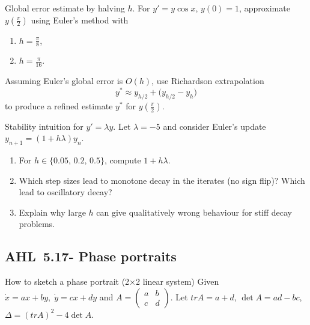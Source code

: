 \documentclass[11pt]{article}
\def\textbf#1{#1}%
\def\mathrm#1{#1}%
\newcommand{\tocsubsection}[1]{\subsection{#1}}
\newcounter{question}
\begin{document}
\begin{question}
\textbf{Global error estimate by halving $h$.}
For $y' = y\cos x$, $y(0)=1$, approximate $y(\tfrac{\pi}{2})$ using Euler’s method with
\begin{enumerate}
  \item $h=\tfrac{\pi}{8}$,
  \item $h=\tfrac{\pi}{16}$.
\end{enumerate}
Assuming Euler’s global error is $O(h)$, use Richardson extrapolation
\[
y^\ast \approx y_{h/2} + \big(y_{h/2}-y_h\big)
\]
to produce a refined estimate $y^\ast$ for $y(\tfrac{\pi}{2})$.
\end{question}

\begin{question}
\textbf{Stability intuition for $y'=\lambda y$.}
Let $\lambda=-5$ and consider Euler’s update $y_{n+1}=(1+h\lambda)y_n$.
\begin{enumerate}
  \item For $h\in\{0.05,\,0.2,\,0.5\}$, compute $1+h\lambda$.
  \item Which step sizes lead to monotone decay in the iterates (no sign flip)? Which lead to oscillatory decay?
  \item Explain why large $h$ can give qualitatively wrong behaviour for stiff decay problems.
\end{enumerate}
\end{question}




\tocsubsection{AHL 5.17- Phase portraits}
\usetikzlibrary{calc}

How to sketch a phase portrait (2×2 linear system)
Given  \(\dot x = ax + by,\;\dot y = cx + dy\) and \(A=\begin{pmatrix}a&b\\c&d\end{pmatrix}\).
Let  \(\mathrm{tr}A=a+d\), \(\det A=ad-bc\), \(\Delta=(\mathrm{tr}A)^2-4\det A\).

\usetikzlibrary{calc}
\end{document}
